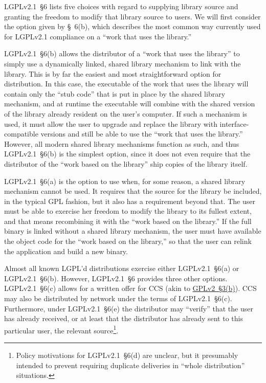 LGPLv2.1~\S6 lists five choices with regard to supplying library source
and granting the freedom to modify that library source to users. We
will first consider the option given by \S~6(b), which describes the
most common way currently used for LGPLv2.1 compliance on a ``work that
uses the library.''

LGPLv2.1~\S6(b) allows the distributor of a ``work that uses the library'' to
simply use a dynamically linked, shared library mechanism to link with the
library. This is by far the easiest and most straightforward option for
distribution. In this case, the executable of the work that uses the
library will contain only the ``stub code'' that is put in place by the
shared library mechanism, and at runtime the executable will combine with
the shared version of the library already resident on the user's computer.
If such a mechanism is used, it must allow the user to upgrade and
replace the library with interface-compatible versions and still be able
to use the ``work that uses the library.''  However, all modern shared
library mechanisms function as such, and thus LGPLv2.1~\S6(b) is the simplest
option, since it does not even require that the distributor of the ``work 
based on the library'' ship copies of the library itself.

LGPLv2.1~\S6(a) is the option to use when, for some reason, a shared library
mechanism cannot be used. It requires that the source for the library be
included, in the typical GPL fashion, but it also has a requirement beyond
that. The user must be able to exercise her freedom to modify the library
to its fullest extent, and that means recombining it with the ``work based
on the library.''  If the full binary is linked without a shared library
mechanism, the user must have available the object code for the ``work
based on the library,'' so that the user can relink the application and
build a new binary.

Almost all known LGPL'd distributions exercise either LGPLv2.1~\S6(a) or
LGPLv2.1~\S6(b).  However, LGPLv2.1~\S6 provides three other options.
LGPLv2.1~\S6(c) allows for a written offer for CCS (akin to
\hyperref[GPLv2s3b]{GPLv2~\S3(b)}).  CCS may also be distributed by network
under the terms of LGPLv2.1~\S6(c).  Furthermore, under LGPLv2.1~\S6(e) the
distributor may ``verify'' that the user has already received, or at least
that the distributor has already sent to this particular user, the relevant
source\footnote{Policy motivations for LGPLv2.1~\S6(d) are unclear, but it
  presumably intended to prevent requiring duplicate deliveries in ``whole
  distribution'' situations.}.

